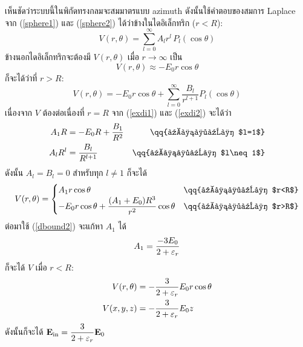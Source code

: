 \begin{soln}
เห็นชัดว่าระบบนี้ในพิกัดทรงกลมจะสมมาตรแบบ azimuth ดังนั้นใช้คำตอบของสมการ Laplace จาก (\ref{sphere1}) และ (\ref{sphere2}) ได้ว่าข้างในไดอิเล็กทริก ($r<R$):
\begin{equation}
    V(r,\theta)=\sum_{l=0}^\infty A_lr^l\,P_l(\cos\theta)\tag{$\star$1}\label{exdi1}
\end{equation}
ข้างนอกไดอิเล็กทริกจะต้องมี $V(r,\theta)$ เมื่อ $r\to\infty$ เป็น
\[V(r,\theta)\approx -E_0r\cos\theta\]
ก็จะได้ว่าที่ $r>R$:
\begin{equation}
    V(r,\theta)=-E_0r\cos\theta+\sum_{l=0}^\infty \frac{B_l}{r^{l+1}}P_l(\cos\theta)\tag{$\star$2}\label{exdi2}
\end{equation}
เนื่องจาก $V$ ต้องต่อเนื่องที่ $r=R$ จาก (\ref{exdi1}) และ (\ref{exdi2}) จะได้ว่า
\begin{alignat*}{2}
    A_1R&=-E_0R+\dfrac{B_1}{R^2}&\qq{เมื่อ $l=1$}\\
    A_lR^l&=\dfrac{B_l}{R^{l+1}}&\qq{เมื่อ $l\neq1$}
\end{alignat*}
ดังนั้น $A_l=B_l=0$ สำหรับทุก $l\neq 1$ ก็จะได้
\[V(r,\theta)=\begin{cases}
    A_1r\cos\theta&\qq{เมื่อ $r<R$}\\
    -E_0r\cos\theta+\dfrac{(A_1+E_0)R^3}{r^2}\cos\theta&\qq{เมื่อ $r>R$}
\end{cases}\]
ต่อมาใช้ (\ref{dbound2}) จะแก้หา $A_1$ ได้
\[A_1=\frac{-3E_0}{2+\varepsilon_r}\]
ก็จะได้ $V$ เมื่อ $r<R$:
\begin{align*}
    V(r,\theta)&=-\frac{3}{2+\varepsilon_r}E_0r\cos\theta\\
    V(x,y,z)&=-\frac{3}{2+\varepsilon_r}E_0z
\end{align*}
ดังนั้นก็จะได้ $\mathbf{E}_{\mathrm{in}}=\dfrac{3}{2+\varepsilon_r}\mathbf{E}_0$
\end{soln}

